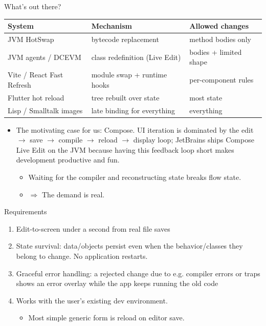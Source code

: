 \documentclass[10pt,presentation]{beamer}
\begin{document}
\begin{frame}[label={sec:org9efc8f9}]{What's out there?}
\begin{center}
\footnotesize\setlength{\tabcolsep}{3pt}
\begin{tabular}{lll}
System & Mechanism & Allowed changes\\
\hline
JVM HotSwap & bytecode replacement & method bodies only\\
JVM agents / DCEVM & class redefinition (Live Edit) & bodies + limited shape\\
Vite / React Fast Refresh & module swap + runtime hooks & per-component rules\\
Flutter hot reload & tree rebuilt over state & most state\\
Lisp / Smalltalk images & late binding for everything & everything\\
\end{tabular}
\end{center}

\begin{itemize}
\item The motivating case for us: \alert{Compose}. UI iteration is dominated by
the edit \(\to\) save \(\to\) compile \(\to\) reload \(\to\) display loop; JetBrains
ships Compose Live Edit on the JVM because having this feedback loop
short makes development productive and \alert{fun}.
\begin{itemize}
\item Waiting for the compiler and reconstructing state breaks flow state.
\item \(\Rightarrow\) The demand is real.
\end{itemize}
\end{itemize}
\end{frame}
\begin{frame}[label={sec:org40a0f8f}]{Requirements}
\begin{enumerate}
\item \alert{Edit-to-screen under a second} from real file saves
\item \alert{State survival}: data/objects persist even when the
behavior/classes they belong to change. No application restarts.
\item \alert{Graceful error handling}: a rejected change due to e.g. compiler
errors or traps shows an error overlay while the app keeps running
the old code
\item Works with the user's existing dev environment.
\begin{itemize}
\item Most simple generic form is reload on editor save.
\end{itemize}
\end{enumerate}
\end{frame}
\end{document}
